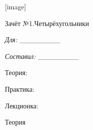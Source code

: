 \documentclass{article}
\begin{document}
    [image]
    
    \thispagestyle{empty}

    \newpage

\begin{titlepage}
    \vspace*{30pt}

    \begin{center}
        {\Huge Зачёт №1.Четырёхугольники} \bigskip

        \textsl{\large Для: \_\_\_\_\_\_\_\_} \bigskip

        \textsl{\large Составил: \_\_\_\_\_\_\_\_}
    \end{center}

    \vspace*{\fill}

    {\LARGE Теория: \underline{\hspace{2cm}}}

    \vspace*{50px}

    {\LARGE Практика: \underline{\hspace{2cm}}}

    \vspace*{50px}

    {\LARGE Лекционка: \underline{\hspace{2cm}}}

    \vspace*{30pt}
\end{titlepage}

\thispagestyle{empty}

\newpage

    {\LARGE Теория}
\end{document}

